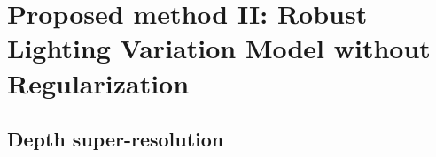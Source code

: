 \section{Proposed method II: Robust Lighting Variation Model without Regularization}

\subsection{Depth super-resolution}



